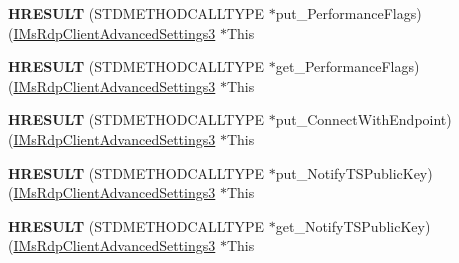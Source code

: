 \begin{DoxyCompactItemize}
{\bfseries H\+R\+E\+S\+U\+LT} (S\+T\+D\+M\+E\+T\+H\+O\+D\+C\+A\+L\+L\+T\+Y\+PE $\ast$put\+\_\+\+Performance\+Flags)(\hyperlink{interface_m_s_t_s_c_lib_1_1_i_ms_rdp_client_advanced_settings3}{I\+Ms\+Rdp\+Client\+Advanced\+Settings3} $\ast$This
\item 
\mbox{\label{struct_m_s_t_s_c_lib_1_1_i_ms_rdp_client_advanced_settings3_vtbl_a8515326c0f8a21760da8a5f0e680b707}} 
{\bfseries H\+R\+E\+S\+U\+LT} (S\+T\+D\+M\+E\+T\+H\+O\+D\+C\+A\+L\+L\+T\+Y\+PE $\ast$get\+\_\+\+Performance\+Flags)(\hyperlink{interface_m_s_t_s_c_lib_1_1_i_ms_rdp_client_advanced_settings3}{I\+Ms\+Rdp\+Client\+Advanced\+Settings3} $\ast$This
\item 
\mbox{\label{struct_m_s_t_s_c_lib_1_1_i_ms_rdp_client_advanced_settings3_vtbl_a28e9ce0e396625c4c46165d435e84d23}} 
{\bfseries H\+R\+E\+S\+U\+LT} (S\+T\+D\+M\+E\+T\+H\+O\+D\+C\+A\+L\+L\+T\+Y\+PE $\ast$put\+\_\+\+Connect\+With\+Endpoint)(\hyperlink{interface_m_s_t_s_c_lib_1_1_i_ms_rdp_client_advanced_settings3}{I\+Ms\+Rdp\+Client\+Advanced\+Settings3} $\ast$This
\item 
\mbox{\label{struct_m_s_t_s_c_lib_1_1_i_ms_rdp_client_advanced_settings3_vtbl_aef3f70aeec78e9ad447e9a60612c60a6}} 
{\bfseries H\+R\+E\+S\+U\+LT} (S\+T\+D\+M\+E\+T\+H\+O\+D\+C\+A\+L\+L\+T\+Y\+PE $\ast$put\+\_\+\+Notify\+T\+S\+Public\+Key)(\hyperlink{interface_m_s_t_s_c_lib_1_1_i_ms_rdp_client_advanced_settings3}{I\+Ms\+Rdp\+Client\+Advanced\+Settings3} $\ast$This
\item 
\mbox{\label{struct_m_s_t_s_c_lib_1_1_i_ms_rdp_client_advanced_settings3_vtbl_a19f4e9020ae772e602765bb454ba2630}} 
{\bfseries H\+R\+E\+S\+U\+LT} (S\+T\+D\+M\+E\+T\+H\+O\+D\+C\+A\+L\+L\+T\+Y\+PE $\ast$get\+\_\+\+Notify\+T\+S\+Public\+Key)(\hyperlink{interface_m_s_t_s_c_lib_1_1_i_ms_rdp_client_advanced_settings3}{I\+Ms\+Rdp\+Client\+Advanced\+Settings3} $\ast$This
\item 
\mbox{\label{struct_m_s_t_s_c_lib_1_1_i_ms_rdp_client_advanced_settings3_vtbl_a3383ed32a997fee54d3ac6ab377d7f9a}} 

\end{DoxyCompactItemize}
